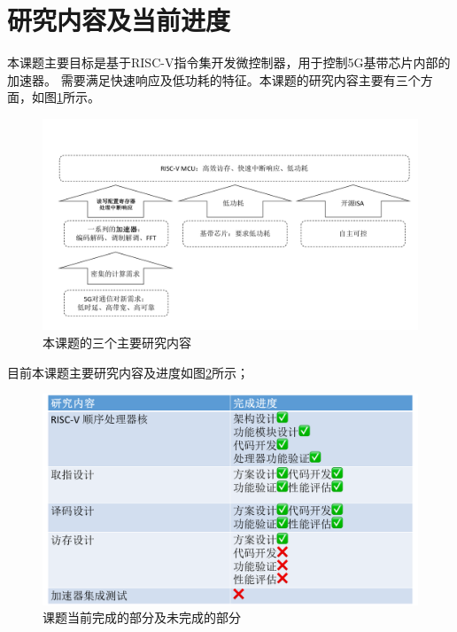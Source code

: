 \documentclass[a4paper, 12pt]{article}
\begin{document}
\section{研究内容及当前进度}%
本课题主要目标是基于RISC-V指令集开发微控制器，用于控制5G基带芯片内部的加速器\cite{9319703}。
需要满足快速响应及低功耗的特征。本课题的研究内容主要有三个方面，如图\ref{fig:research_topics}所示。
\begin{figure}[htbp]
  \centering
  \includegraphics[width=0.8\linewidth]{./images/research_topics.pdf}
  \caption{本课题的三个主要研究内容}
  \label{fig:research_topics}
\end{figure}

目前本课题主要研究内容及进度如图\ref{fig:study_progress}所示；%

\begin{figure}[htbp]
  \centering
  \includegraphics[width=\linewidth]{./images/study_progress.pdf}
  \caption{课题当前完成的部分及未完成的部分}
  \label{fig:study_progress}
\end{figure}

\end{document}
